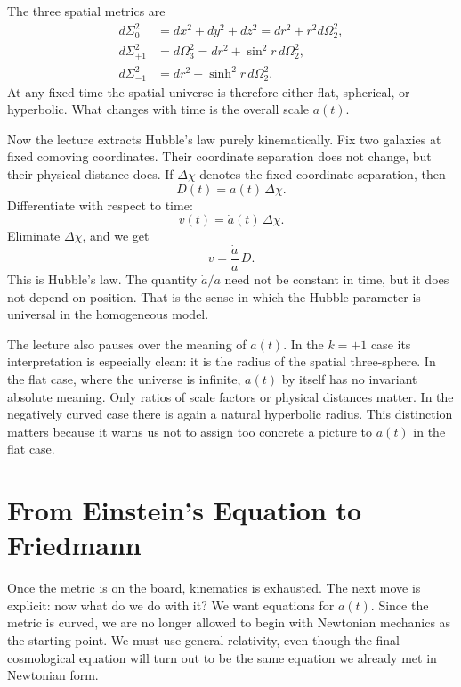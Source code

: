 The three spatial metrics are
\begin{align}
d\Sigma_{0}^{2} &= dx^{2}+dy^{2}+dz^{2}
               = dr^{2}+r^{2}d\Omega_{2}^{2}, \\
d\Sigma_{+1}^{2} &= d\Omega_{3}^{2}
                 = dr^{2}+\sin^{2}r\,d\Omega_{2}^{2}, \\
d\Sigma_{-1}^{2} &= dr^{2}+\sinh^{2}r\,d\Omega_{2}^{2}.
\end{align}
At any fixed time the spatial universe is therefore either flat, spherical, or hyperbolic. What changes with time is the overall scale \(a(t)\).

Now the lecture extracts Hubble's law purely kinematically. Fix two galaxies at fixed comoving coordinates. Their coordinate separation does not change, but their physical distance does. If \(\Delta\chi\) denotes the fixed coordinate separation, then
\begin{equation}
D(t)=a(t)\,\Delta\chi .
\end{equation}
Differentiate with respect to time:
\begin{equation}
v(t)=\dot a(t)\,\Delta\chi .
\end{equation}
Eliminate \(\Delta\chi\), and we get
\begin{equation}
v=\frac{\dot a}{a}\,D .
\end{equation}
This is Hubble's law. The quantity \(\dot a/a\) need not be constant in time, but it does not depend on position. That is the sense in which the Hubble parameter is universal in the homogeneous model.

The lecture also pauses over the meaning of \(a(t)\). In the \(k=+1\) case its interpretation is especially clean: it is the radius of the spatial three-sphere. In the flat case, where the universe is infinite, \(a(t)\) by itself has no invariant absolute meaning. Only ratios of scale factors or physical distances matter. In the negatively curved case there is again a natural hyperbolic radius. This distinction matters because it warns us not to assign too concrete a picture to \(a(t)\) in the flat case.

\section{From Einstein's Equation to Friedmann}

Once the metric is on the board, kinematics is exhausted. The next move is explicit: now what do we do with it? We want equations for \(a(t)\). Since the metric is curved, we are no longer allowed to begin with Newtonian mechanics as the starting point. We must use general relativity, even though the final cosmological equation will turn out to be the same equation we already met in Newtonian form.

